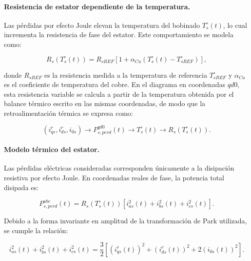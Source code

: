 \documentclass[10pt,a4paper]{article}
\begin{document}
\paragraph{Resistencia de estator dependiente de la temperatura.}
Las pérdidas por efecto Joule elevan la temperatura del bobinado $T_s^{\circ}(t)$, lo cual incrementa la resistencia de fase del estator. Este comportamiento se modela como:

\begin{equation}
	R_s\left(T_s^{\circ}(t)\right)=R_{sREF}\left[1+\alpha_{Cu}\left(T_s^{\circ}(t)-T_{sREF}^{\circ}\right)\right],
	\label{eq:resistencia_termica}
\end{equation}

donde $R_{sREF}$ es la resistencia medida a la temperatura de referencia $T_{sREF}^{\circ}$ y $\alpha_{Cu}$ es el coeficiente de temperatura del cobre. En el diagrama en coordenadas $qd0$, esta resistencia variable se calcula a partir de la temperatura obtenida por el balance térmico escrito en las mismas coordenadas, de modo que la retroalimentación térmica se expresa como:

\begin{equation*}
	\left(i_{qs}^{r},i_{ds}^{r},i_{0s}\right) \longrightarrow P_{s,perd}^{qd0}(t) \longrightarrow T_s^{\circ}(t) \longrightarrow R_s\left(T_s^{\circ}(t)\right).
\end{equation*}

\paragraph{Modelo térmico del estator.}
Las pérdidas eléctricas consideradas corresponden únicamente a la disipación resistiva por efecto Joule. En coordenadas reales de fase, la potencia total disipada es:

\begin{equation}
	P_{s,perd}^{abc}(t)=R_s\left(T_s^{\circ}(t)\right)\left[i_{as}^{2}(t)+i_{bs}^{2}(t)+i_{cs}^{2}(t)\right].
	\label{eq:potencia_joule_abc}
\end{equation}

Debido a la forma invariante en amplitud de la transformación de Park utilizada, se cumple la relación:

\begin{equation*}
	i_{as}^{2}(t)+i_{bs}^{2}(t)+i_{cs}^{2}(t)
	=\frac{3}{2}\left[\left(i_{qs}^{r}(t)\right)^2+\left(i_{ds}^{r}(t)\right)^2+2\left(i_{0s}(t)\right)^2\right].
\end{equation*}
\end{document}
